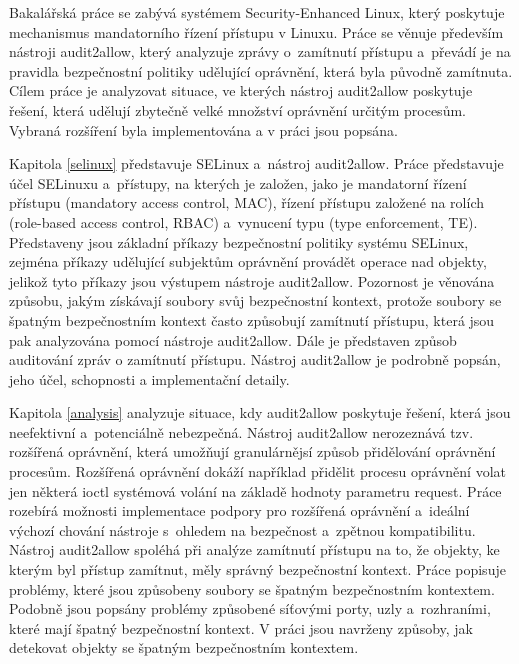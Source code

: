 Bakalářská práce se zabývá systémem Security-Enhanced Linux, který poskytuje
mechanismus mandatorního řízení přístupu v Linuxu. Práce se věnuje především
nástroji audit2allow, který analyzuje zprávy o~zamítnutí přístupu a~převádí je
na pravidla bezpečnostní politiky udělující oprávnění, která byla původně
zamítnuta. Cílem práce je analyzovat situace, ve kterých nástroj audit2allow
poskytuje řešení, která udělují zbytečně velké množství oprávnění určitým
procesům. Vybraná rozšíření byla implementována a v práci jsou popsána.

Kapitola \ref{selinux} představuje SELinux a~nástroj audit2allow. Práce
představuje účel SELinuxu a~přístupy, na kterých je založen, jako je mandatorní
řízení přístupu (mandatory access control, MAC), řízení přístupu založené na
rolích (role-based access control, RBAC) a~vynucení typu (type enforcement, TE).
Představeny jsou základní příkazy bezpečnostní politiky systému SELinux, zejména
příkazy udělující subjektům oprávnění provádět operace nad objekty, jelikož tyto
příkazy jsou výstupem nástroje audit2allow. Pozornost je věnována způsobu, jakým
získávají soubory svůj bezpečnostní kontext, protože soubory se špatným
bezpečnostním kontext často způsobují zamítnutí přístupu, která jsou pak
analyzována pomocí nástroje audit2allow. Dále je představen způsob auditování
zpráv o zamítnutí přístupu. Nástroj audit2allow je podrobně popsán, jeho účel,
schopnosti a implementační detaily.

Kapitola \ref{analysis} analyzuje situace, kdy audit2allow poskytuje řešení,
která jsou neefektivní a~potenciálně nebezpečná. Nástroj audit2allow nerozeznává
tzv. rozšířená oprávnění, která umožňují granulárnějsí způsob přidělování
oprávnění procesům. Rozšířená oprávnění dokáží například přidělit procesu
oprávnění volat jen některá ioctl systémová volání na základě hodnoty parametru
request. Práce rozebírá možnosti implementace podpory pro rozšířená oprávnění
a~ideální výchozí chování nástroje s~ohledem na bezpečnost a~zpětnou
kompatibilitu.
Nástroj audit2allow spoléhá při analýze zamítnutí přístupu na to, že
objekty, ke kterým byl přístup zamítnut, měly správný bezpečnostní kontext.
Práce popisuje problémy, které jsou způsobeny soubory se špatným bezpečnostním
kontextem. Podobně jsou popsány problémy způsobené síťovými porty, uzly
a~rozhraními, které mají špatný bezpečnostní kontext. V práci jsou navrženy
způsoby, jak detekovat objekty se špatným bezpečnostním kontextem.

